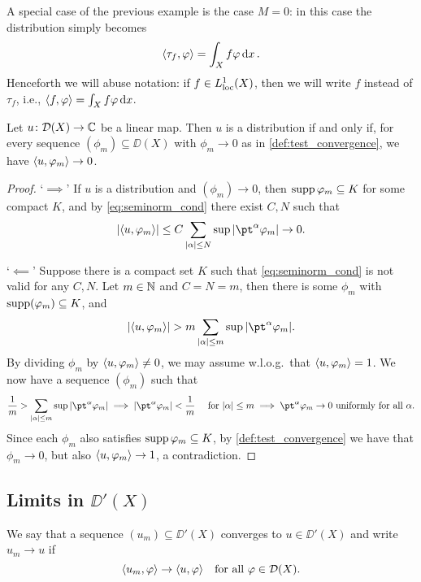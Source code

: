 A special case of the previous example is the case $M = 0$: in this case the distribution simply becomes
\[
\langle\tau_f, \varphi\rangle = \int_X f \varphi \dd{x}. 
\]
Henceforth we will abuse notation: if $f \in L^1_{\mathrm{loc}}(X)$, then we will write $f$ instead of $\tau_f$, i.e., $\langle f, \varphi\rangle = \int_X f\varphi \dd{x}$. 

\begin{lemma} \label{lem:seq_continuity}
    Let $u \colon \mathcal D(X) \to \mathbb C$ be a linear map. Then $u$ is a distribution if and only if, for every sequence $(\phi_m) \subseteq \DD(X)$ with $\phi_m \to 0$ as in \cref{def:test_convergence}, we have $\langle u, \varphi_m\rangle \to 0$. 
\end{lemma}

\begin{proof}
    `$\implies$' If $u$ is a distribution and $(\phi_m) \to 0$, then $\operatorname{supp}\varphi_m \subseteq K$ for some compact $K$, and by \cref{eq:seminorm_cond} there exist $C, N$ such that
    \[
    \abs{\ang{u, \phi_m}} \leq C \sum_{\abs{\alpha} \leq N} \sup \abs{\pt^\alpha \phi_m} \to 0. 
    \]
    
    `$\impliedby$' Suppose there is a compact set $K$ such that \cref{eq:seminorm_cond} is not valid for any $C, N$. Let $m \in \mathbb N$ and $C = N = m$, then there is some $\phi_m$ with $\operatorname{supp}(\varphi_m) \subseteq K$, and 
    \[
    \abs{\ang{u, \phi_m}} > m \sum_{\abs{\alpha} \leq m} \sup \abs{\pt^\alpha \phi_m}. 
    \]
    By dividing $\phi_m$ by $\langle u, \varphi_m\rangle \neq 0$, we may assume w.l.o.g.\ that $\langle u, \varphi_m\rangle = 1$. 
    We now have a sequence $(\phi_m)$ such that
    \[
    \frac1m > \sum_{\abs{\alpha} \leq m} \sup \abs{\pt^\alpha \phi_m} \implies  \abs{\pt^\alpha \phi_m} < \frac1m \quad\text{ for $\abs{\alpha} \leq m$} \implies \pt^\alpha \phi_m \to 0 \text{ uniformly for all $\alpha$}. 
    \]
    Since each $\phi_m$ also satisfies $\operatorname{supp}\varphi_m\subseteq K$, by \cref{def:test_convergence} we have that $\phi_m \to 0$, but also $\langle u, \varphi_m\rangle \to 1$, a contradiction. 
\end{proof}

\subsection{Limits in $\DD'(X)$}
\begin{definition}
    We say that a sequence $(u_m) \subseteq \DD'(X)$ converges to $u \in \DD'(X)$ and write $u_m \to u$ if 
    \[
    \langle u_m, \varphi\rangle \to \langle u, \varphi\rangle \quad\text{for all $\varphi \in \mathcal D(X)$}. 
    \]
\end{definition}

